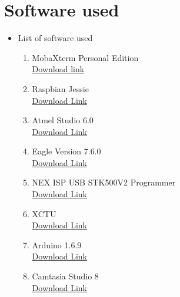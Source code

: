 \documentclass[a4paper,12pt,oneside]{book}
\begin{document}
\section{Software used}
\begin{itemize}
  \item List of software used 
  \begin{enumerate}
      \item MobaXterm Personal Edition \\
      \href{http://mobaxterm.mobatek.net/MobaXterm_Setup_9.1.msi} {Download link}
      \item Raspbian Jessie   \\
      \href{https://downloads.raspberrypi.org/raspbian_latest}{Download Link}
      \item Atmel Studio 6.0 \\
      \href{http://atmel-studio.software.informer.com/download/?ca56297}{Download Link}
      \item Eagle Version 7.6.0 \\
      \href{http://www.cadsoftusa.com/download-eagle/}{Download Link}
      \item NEX ISP USB STK500V2 Programmer \\
      \href{http://www.nex-robotics.com/images/downloads/NEX\%20AVR\%20STK500V2.zip}{Download Link}
      \item XCTU \\
      \href{http://www.digi.com/products/xbee-rf-solutions/xctu-software/xctu#productsupport-utilities}{Download Link}
      \item Arduino 1.6.9  \\
       \href{https://www.arduino.cc/en/Main/Software}{Download Link}
      \item Camtasia Studio 8 \\
      \href{http://filehippo.com/download_camtasia_studio/download/fc20113e4355b8a0434494faa4ca14e3/}{Download Link}
      
      
  \end{enumerate}
\end{itemize}
\end{document}
